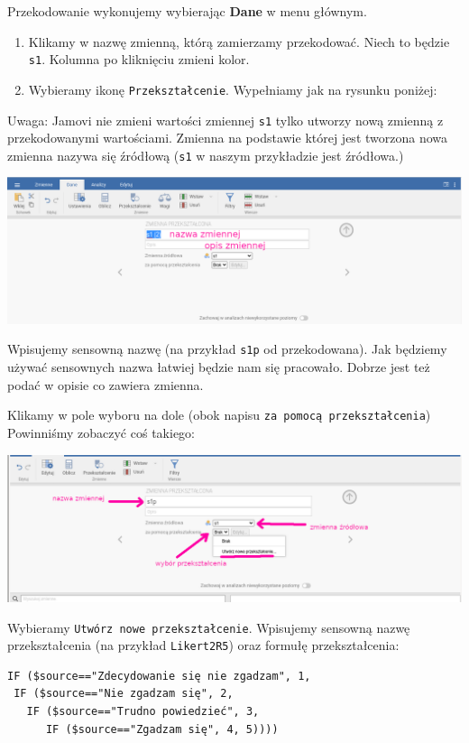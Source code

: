 \documentclass[
  openany]{book}
\begin{document}
Przekodowanie wykonujemy wybierając \textbf{Dane} w menu głównym.

\begin{enumerate}
\def\labelenumi{\arabic{enumi}.}
\item
  Klikamy w nazwę zmienną, którą zamierzamy przekodować. Niech to będzie \texttt{s1}.
  Kolumna po kliknięciu zmieni kolor.
\item
  Wybieramy ikonę \texttt{Przekształcenie}. Wypełniamy jak na rysunku poniżej:
\end{enumerate}

Uwaga: Jamovi nie zmieni wartości zmiennej \texttt{s1} tylko utworzy nową zmienną
z przekodowanymi wartościami. Zmienna na podstawie której jest tworzona
nowa zmienna nazywa się źródłową (\texttt{s1} w naszym przykładzie jest źródłowa.)

\includegraphics{./przeksztalcenie_0.png}

Wpisujemy sensowną nazwę (na przykład \texttt{s1p} od przekodowana). Jak będziemy
używać sensownych nazwa łatwiej będzie nam się pracowało. Dobrze jest
też podać w opisie co zawiera zmienna.

Klikamy w pole wyboru na dole (obok napisu \texttt{za\ pomocą\ przekształcenia})
Powinniśmy zobaczyć coś takiego:

\includegraphics{./przeksztalcenie_1.png}

Wybieramy \texttt{Utwórz\ nowe\ przekształcenie}. Wpisujemy sensowną nazwę
przekształcenia (na przykład \texttt{Likert2R5}) oraz formułę przekształcenia:

\begin{verbatim}
IF ($source=="Zdecydowanie się nie zgadzam", 1,
 IF ($source=="Nie zgadzam się", 2,
   IF ($source=="Trudno powiedzieć", 3,
      IF ($source=="Zgadzam się", 4, 5))))
\end{verbatim}
\end{document}
